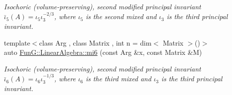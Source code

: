 \begin{DoxyCompactItemize}
\begin{DoxyCompactList}\small\item\em Isochoric (volume-\/preserving), second modified principal invariant $ \bar\iota_5(A)=\iota_5\iota_3^{-2/3} $, where $\iota_5$ is the second mixed and $\iota_3$ is the third principal invariant. \end{DoxyCompactList}\item 
{\footnotesize template$<$class Arg , class Matrix , int n = dim$<$ Matrix $>$()$>$ }\\auto \hyperlink{group__InvariantGroup_ga3e451f9e15fa95080f81d0c0f69f93e6}{Fun\+G\+::\+Linear\+Algebra\+::mi6} (const Arg \&x, const Matrix \&M)
\begin{DoxyCompactList}\small\item\em Isochoric (volume-\/preserving), second modified principal invariant $ \bar\iota_6(A)=\iota_6\iota_3^{-1/3} $, where $\iota_6$ is the third mixed and $\iota_3$ is the third principal invariant. \end{DoxyCompactList}\end{DoxyCompactItemize}
